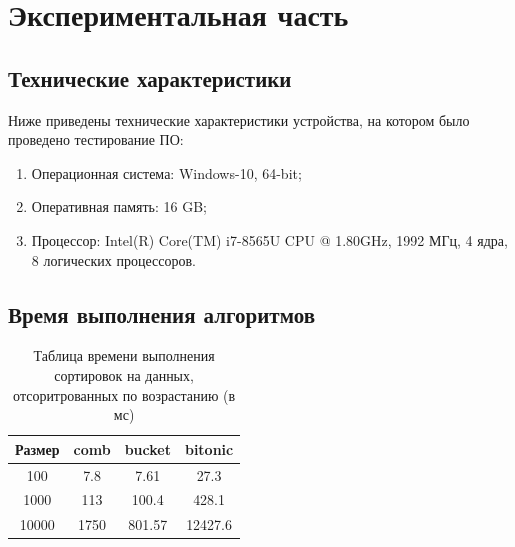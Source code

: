 \documentclass[12pt]{report}
\begin{document}
	\chapter{Экспериментальная часть}
	
	\section{Технические характеристики}
	
	Ниже приведены технические характеристики устройства, на котором было проведено тестирование ПО:
	
	\begin{enumerate}
		\item Операционная система: Windows-10, 64-bit;
		\item Оперативная память: 16 GB;
		\item Процессор: Intel(R) Core(TM) i7-8565U CPU @ 1.80GHz, 1992 МГц, 4 ядра, 8 логических процессоров.
		
		
	\end{enumerate}
	
	\section{Время выполнения алгоритмов}
	
	\begin{table} [h!]
		\caption{Таблица времени выполнения сортировок на данных, отсоритрованных по возрастанию (в мс)}
		\begin{center}
			\begin{tabular}{|c | c | c | c|}
				
				\hline
				
				Размер & comb & bucket & bitonic  \\ [0.5ex]
				
				\hline
				
				100 & 7.8 & 7.61 & 27.3 \\ 
				
				\hline 
				
				1000 & 113 & 100.4 & 428.1 \\ 
				
				\hline 
				
				10000 & 1750 & 801.57 & 12427.6 \\ 
				
				\hline 
			\end{tabular}
		\end{center}
	\end{table}
\end{document}
